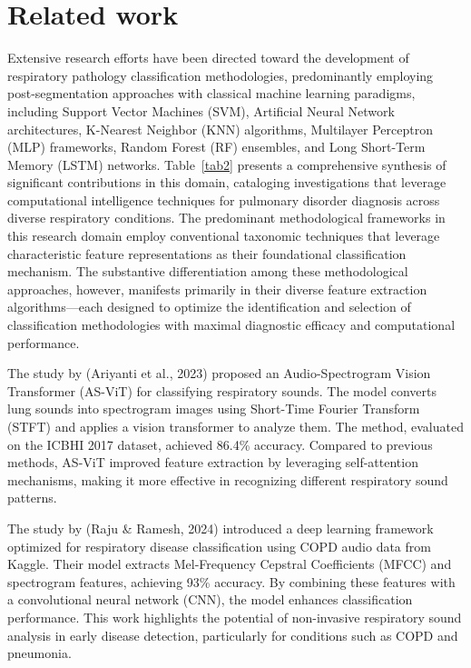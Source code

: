 \section{Related work}
\label{sec:relatedwork}
Extensive research efforts have been directed toward the development of respiratory pathology classification methodologies, predominantly employing post-segmentation approaches with classical machine learning paradigms, including Support Vector Machines (SVM), Artificial Neural Network architectures, K-Nearest Neighbor (KNN) algorithms, Multilayer Perceptron (MLP) frameworks, Random Forest (RF) ensembles, and Long Short-Term Memory (LSTM) networks. Table~\ref{tab2} presents a comprehensive synthesis of significant contributions in this domain, cataloging investigations that leverage computational intelligence techniques for pulmonary disorder diagnosis across diverse respiratory conditions.
The predominant methodological frameworks in this research domain employ conventional taxonomic techniques that leverage characteristic feature representations as their foundational classification mechanism. The substantive differentiation among these methodological approaches, however, manifests primarily in their diverse feature extraction algorithms—each designed to optimize the identification and selection of classification methodologies with maximal diagnostic efficacy and computational performance.

The study by (Ariyanti et al., 2023) \cite{b07} proposed an Audio-Spectrogram Vision Transformer (AS-ViT) for classifying respiratory sounds. The model converts lung sounds into spectrogram images using Short-Time Fourier Transform (STFT) and applies a vision transformer to analyze them. The method, evaluated on the ICBHI 2017 dataset, achieved 86.4\% accuracy. Compared to previous methods, AS-ViT improved feature extraction by leveraging self-attention mechanisms, making it more effective in recognizing different respiratory sound patterns.

The study by (Raju \& Ramesh, 2024) \cite{b08} introduced a deep learning framework optimized for respiratory disease classification using COPD audio data from Kaggle. Their model extracts Mel-Frequency Cepstral Coefficients (MFCC) and spectrogram features, achieving 93\% accuracy. By combining these features with a convolutional neural network (CNN), the model enhances classification performance. This work highlights the potential of non-invasive respiratory sound analysis in early disease detection, particularly for conditions such as COPD and pneumonia.

